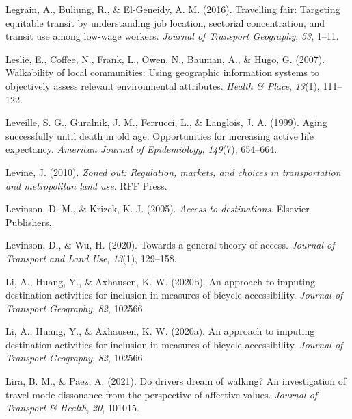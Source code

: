 \documentclass[
11pt, %
oneside, %
english, %
singlespacing, %
]{macthesis} %
\newlength{\cslhangindent}
\newenvironment{CSLReferences}[2] %
 {%
  \setlength{\parindent}{0pt}
  \ifodd #1 \everypar{\setlength{\hangindent}{\cslhangindent}}\ignorespaces\fi
  \ifnum #2 > 0
  \setlength{\parskip}{#2\baselineskip}
  \fi
 }%
 {}
\begin{document}
\begin{CSLReferences}{1}{0}
\leavevmode{}%
Legrain, A., Buliung, R., \& El-Geneidy, A. M. (2016). Travelling fair: Targeting equitable transit by understanding job location, sectorial concentration, and transit use among low-wage workers. \emph{Journal of Transport Geography}, \emph{53}, 1--11.

\leavevmode{}%
Leslie, E., Coffee, N., Frank, L., Owen, N., Bauman, A., \& Hugo, G. (2007). Walkability of local communities: Using geographic information systems to objectively assess relevant environmental attributes. \emph{Health \& Place}, \emph{13}(1), 111--122.

\leavevmode{}%
Leveille, S. G., Guralnik, J. M., Ferrucci, L., \& Langlois, J. A. (1999). Aging successfully until death in old age: Opportunities for increasing active life expectancy. \emph{American Journal of Epidemiology}, \emph{149}(7), 654--664.

\leavevmode{}%
Levine, J. (2010). \emph{Zoned out: Regulation, markets, and choices in transportation and metropolitan land use}. RFF Press.

\leavevmode{}%
Levinson, D. M., \& Krizek, K. J. (2005). \emph{Access to destinations}. Elsevier Publishers.

\leavevmode{}%
Levinson, D., \& Wu, H. (2020). Towards a general theory of access. \emph{Journal of Transport and Land Use}, \emph{13}(1), 129--158.

\leavevmode{}%
Li, A., Huang, Y., \& Axhausen, K. W. (2020b). An approach to imputing destination activities for inclusion in measures of bicycle accessibility. \emph{Journal of Transport Geography}, \emph{82}, 102566.

\leavevmode{}%
Li, A., Huang, Y., \& Axhausen, K. W. (2020a). An approach to imputing destination activities for inclusion in measures of bicycle accessibility. \emph{Journal of Transport Geography}, \emph{82}, 102566.

\leavevmode{}%
Lira, B. M., \& Paez, A. (2021). Do drivers dream of walking? An investigation of travel mode dissonance from the perspective of affective values. \emph{Journal of Transport \& Health}, \emph{20}, 101015.


\end{CSLReferences}
\end{document}
